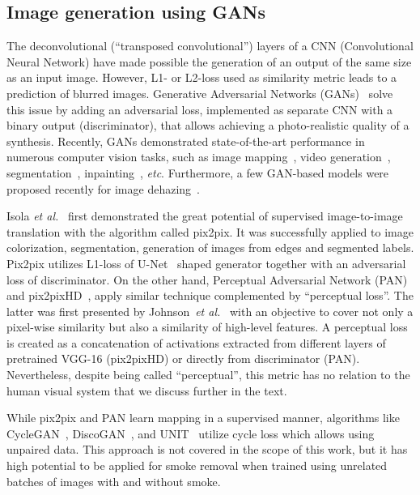 \documentclass[pmlr]{jmlr}
\begin{document}
\subsection{Image generation using GANs}
The deconvolutional (``transposed convolutional'') layers of a CNN (Convolutional Neural Network) have made possible the generation of an output of the same size as an input image. However, L1- or L2-loss used as similarity metric leads to a prediction of blurred images. Generative Adversarial Networks (GANs)~\citep{goodfellow2014generative} solve this issue by adding an adversarial loss, implemented as separate CNN with a binary output (discriminator), that allows achieving a photo-realistic quality of a synthesis. Recently, GANs demonstrated state-of-the-art performance in numerous computer vision tasks, such as image mapping~\citep{isola2017image}, video generation~\citep{wang2018video},  segmentation~\citep{luc2016semantic},  inpainting~\citep{iizuka2017globally},
\emph{etc}. Furthermore, a few GAN-based models were proposed recently for image dehazing~\citep{bharath2018single, li2018single}.%
\par 
Isola \textit{et al.}~\citep{isola2017image} first demonstrated the great potential of supervised image-to-image translation with the algorithm called pix2pix. It was successfully applied to image colorization, segmentation, generation of images from edges and segmented labels. Pix2pix utilizes L1-loss of U-Net~\citep{ronneberger2015u} shaped generator together with an adversarial loss of discriminator. On the other hand, Perceptual Adversarial Network (PAN)~\citep{wang2018perceptual} and pix2pixHD~\citep{wang2017high}, apply similar technique complemented by “perceptual loss”. The latter was first presented by Johnson~\textit{et al.}~\citep{johnson2016perceptual} with an objective to cover not only a pixel-wise similarity but also a similarity of high-level features. A perceptual loss is created as a concatenation of activations extracted from different layers of pretrained VGG-16 (pix2pixHD) or directly from discriminator (PAN). Nevertheless, despite being called “perceptual”, this metric has no relation to the human visual system that we discuss further in the text. 
\par 
While pix2pix and PAN learn mapping in a supervised manner, algorithms like CycleGAN~\citep{zhu2017unpaired}, DiscoGAN~\citep{kim2017learning}, and UNIT~\citep{liu2017unsupervised} utilize cycle loss which allows using unpaired data. This approach is not covered in the scope of this work, but it has high potential to be applied for smoke removal when trained using unrelated batches of images with and without smoke.
\end{document}
